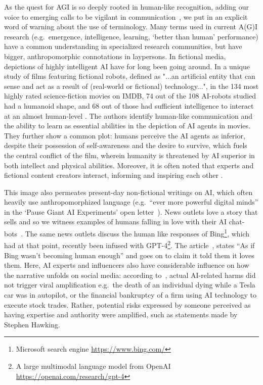 \documentclass{article}
\theoremstyle{plain}
\theoremstyle{definition}
\theoremstyle{remark}
\begin{document}
As the quest for AGI is so deeply rooted in human-like recognition, adding our voice to emerging calls to be vigilant in communication~\cite{shanahan2024talking}, we put in an explicit word of warning about the use of terminology. Many terms used in current A(G)I research (e.g.\ emergence, intelligence, learning, `better than human' performance) have a common understanding in specialized research communities, but have bigger, anthropomorphic connotations in laypersons. In fictional media, depictions of highly intelligent AI have for long been going around. In a unique study of films featuring fictional robots, defined as "...an artificial entity that can sense and act as a result of (real-world or fictional) technology...", in the 134 most highly rated science-fiction movies on IMDB, 74 out of the 108 AI-robots studied had a humanoid shape, and 68 out of those had sufficient intelligence to interact at an almost human-level \cite{saffari2021does}. The authors identify human-like communication and the ability to learn as essential abilities in the depiction of AI agents in movies. They further show a common plot: humans perceive the AI agents as inferior, despite their possession of self-awareness and the desire to survive, which fuels the central conflict of the film, wherein humanity is threatened by AI superior in both intellect and physical abilities. Moreover, it is often noted that experts and fictional content creators interact, informing and inspiring each other \cite{saffari2021does, neri2020role}.

This image also permeates present-day non-fictional writings on AI, which often heavily use anthropomorphized language (e.g.\ ``ever more powerful digital minds'' in the `Pause Giant AI Experiments' open letter~\cite{pauseai}). News outlets love a story that sells and so we witness examples of humans falling in love with their AI chat-bots~\cite{replika,nytimesailove}. The same news outlets discuss the human like responses of Bing\footnote{Microsoft search engine \url{https://www.bing.com/}}, which had at that point, recently been infused with GPT-4\footnote{A large multimodal language model from OpenAI \url{https://openai.com/research/gpt-4}}. The article~\cite{nytimesbing}, states ``As if Bing wasn’t becoming human enough'' and goes on to claim it told them it loves them. Here, AI experts and influencers also have considerable influence on how the narrative unfolds on social media: according to~\citet{neri2020role}, actual AI-related harms did not trigger viral amplification e.g.\ the death of an individual dying while a Tesla car was in autopilot, or the financial bankruptcy of a firm using AI technology to execute stock trades. Rather, potential risks expressed by someone perceived as having expertise and authority were amplified, such as statements made by Stephen Hawking.%
\end{document}
